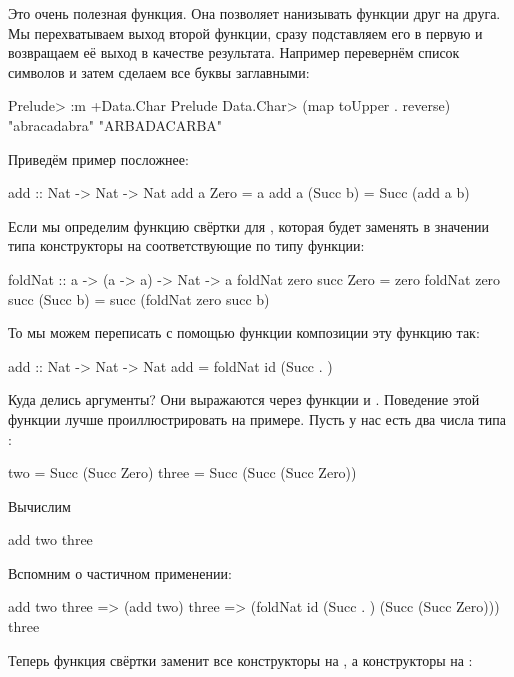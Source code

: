Это очень полезная функция. Она позволяет нанизывать функции друг на
друга. Мы перехватываем выход второй функции, сразу подставляем его в
первую и возвращаем её выход в качестве результата. Например перевернём
список символов и затем сделаем все буквы заглавными:


\begin{code}
Prelude> :m +Data.Char
Prelude Data.Char> (map toUpper . reverse) "abracadabra"
"ARBADACARBA"
\end{code}

Приведём пример посложнее:


\begin{code}
add :: Nat -> Nat -> Nat
add  a  Zero     = a
add  a  (Succ b) = Succ (add a b)
\end{code}

Если мы определим функцию свёртки для , которая будет заменять в
значении типа  конструкторы на соответствующие по типу функции:


\begin{code}
foldNat :: a -> (a -> a) -> Nat -> a
foldNat zero succ Zero     = zero
foldNat zero succ (Succ b) = succ (foldNat zero succ b)
\end{code}

То мы можем переписать с помощью функции композиции эту функцию так:


\begin{code}
add :: Nat -> Nat -> Nat
add = foldNat  id  (Succ . )
\end{code}

Куда делись аргументы? Они выражаются через функции  и .
Поведение этой функции лучше проиллюстрировать на примере. Пусть у нас
есть два числа типа :


\begin{code}
two     = Succ (Succ Zero)
three   = Succ (Succ (Succ Zero))
\end{code}

Вычислим


\begin{code}
add two three
\end{code}

Вспомним о частичном применении:


\begin{code}
    add two three 
=>  (add two) three
=>  (foldNat id (Succ . ) (Succ (Succ Zero))) three
\end{code}

Теперь функция свёртки заменит все конструкторы  на
, а конструкторы  на :



